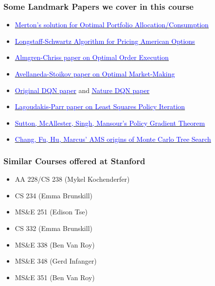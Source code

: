 \documentclass[handout]{beamer}
\begin{document}
\begin{frame}
\frametitle{Some Landmark Papers we cover in this course}
\begin{itemize}
\item \href{https://www.jstor.org/stable/1926560}{\underline{\textcolor{blue}{Merton's solution for Optimal Portfolio Allocation/Consumption}}}
\item \href{https://people.math.ethz.ch/~hjfurrer/teaching/LongstaffSchwartzAmericanOptionsLeastSquareMonteCarlo.pdf}{\underline{\textcolor{blue}{Longstaff-Schwartz Algorithm for Pricing American Options}}}
\item \href{https://pdfs.semanticscholar.org/3d2d/773983c5201b58586af463f045befae5bbf2.pdf}{\underline{\textcolor{blue}{Almgren-Chriss paper on Optimal Order Execution}}}
\item \href{https://www.math.nyu.edu/faculty/avellane/HighFrequencyTrading.pdf}{\underline{\textcolor{blue}{Avellaneda-Stoikov paper on Optimal Market-Making}}}
\item \href{https://www.cs.toronto.edu/~vmnih/docs/dqn.pdf}{\underline{\textcolor{blue}{Original DQN paper}}} and \href{https://storage.googleapis.com/deepmind-media/dqn/DQNNaturePaper.pdf}{\underline{\textcolor{blue}{Nature DQN paper}}}
\item \href{http://www.jmlr.org/papers/volume4/lagoudakis03a/lagoudakis03a.pdf}{\underline{\textcolor{blue}{Lagoudakis-Parr paper on Least Squares Policy Iteration}}}
\item \href{http://papers.nips.cc/paper/1713-policy-gradient-methods-for-reinforcement-learning-with-function-approximation.pdf}{\underline{\textcolor{blue}{Sutton, McAllester, Singh, Mansour's Policy Gradient Theorem}}}
\item \href{https://pdfs.semanticscholar.org/a378/b2895a3e3f6a19cdff1a0ad404b301b5545f.pdf}{\underline{\textcolor{blue}{Chang, Fu, Hu, Marcus' AMS origins of Monte Carlo Tree Search}}}
\end{itemize}
\end{frame}


\begin{frame}
\frametitle{Similar Courses offered at Stanford}
\begin{itemize}
\item AA 228/CS 238 (Mykel Kochenderfer)
\item CS 234 (Emma Brunskill)
\item MS\&E 251 (Edison Tse)
\item CS 332 (Emma Brunskill)
\item MS\&E 338 (Ben Van Roy)
\item MS\&E 348 (Gerd Infanger)
\item MS\&E 351 (Ben Van Roy)
\end{itemize}
\end{frame}
\end{document}
